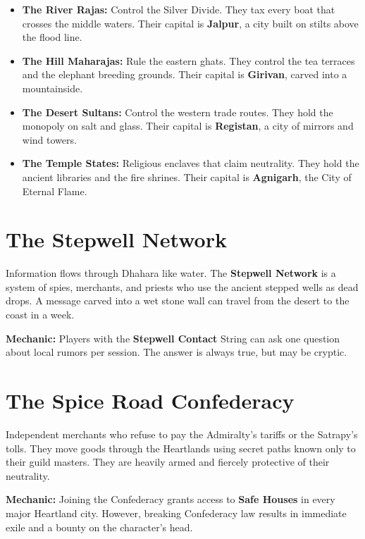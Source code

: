 \documentclass[11pt]{book}
\begin{document}
\begin{itemize}
    \item \textbf{The River Rajas:} Control the Silver Divide. They tax every boat that crosses the middle waters. Their capital is \textbf{Jalpur}, a city built on stilts above the flood line.
    \item \textbf{The Hill Maharajas:} Rule the eastern ghats. They control the tea terraces and the elephant breeding grounds. Their capital is \textbf{Girivan}, carved into a mountainside.
    \item \textbf{The Desert Sultans:} Control the western trade routes. They hold the monopoly on salt and glass. Their capital is \textbf{Registan}, a city of mirrors and wind towers.
    \item \textbf{The Temple States:} Religious enclaves that claim neutrality. They hold the ancient libraries and the fire shrines. Their capital is \textbf{Agnigarh}, the City of Eternal Flame.
\end{itemize}

\section{The Stepwell Network}
Information flows through Dhahara like water. The \textbf{Stepwell Network} is a system of spies, merchants, and priests who use the ancient stepped wells as dead drops. A message carved into a wet stone wall can travel from the desert to the coast in a week.

\textbf{Mechanic:} Players with the \textbf{Stepwell Contact} String can ask one question about local rumors per session. The answer is always true, but may be cryptic.

\section{The Spice Road Confederacy}
Independent merchants who refuse to pay the Admiralty's tariffs or the Satrapy's tolls. They move goods through the Heartlands using secret paths known only to their guild masters. They are heavily armed and fiercely protective of their neutrality.

\textbf{Mechanic:} Joining the Confederacy grants access to \textbf{Safe Houses} in every major Heartland city. However, breaking Confederacy law results in immediate exile and a bounty on the character's head.
\end{document}

